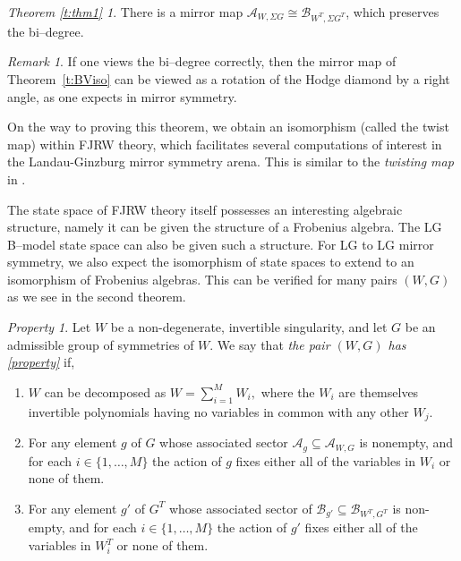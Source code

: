 \documentclass[10pt, letterpaper]{amsart}
\theoremstyle{remark}
\newtheorem{rem}{Remark}[thm]
\providecommand*{\propertyautorefname}{Property}
\newtheorem{property}{\propertyautorefname}
\newtheorem*{thm1}{Theorem \ref{t:thm1}}
\newcommand{\sA}{\mathscr{A}}
\newcommand{\sB}{\mathscr{B}}
\newcommand{\s}[1]{\Sigma #1}
\newcommand{\amanda}[1]{\todo[color=red(munsell),fancyline]{Am:#1}}
\newcommand{\nathan}[1]{\todo[color=pistachio,fancyline]{N:#1}}
\begin{document}
\begin{thm1}
There is a mirror map $\sA_{W,\s{G}}\cong \sB_{W^T,\s{G^T}}$, which preserves the bi--degree. 
\end{thm1}

\begin{rem}
	If one views the bi--degree correctly, then the mirror map of Theorem~\ref{t:BViso} can be viewed as a rotation of the Hodge diamond by a right angle, as one expects in mirror symmetry.
\end{rem}

On the way to proving this theorem, we obtain an isomorphism (called the twist map) within FJRW theory, which facilitates several computations of interest in the Landau-Ginzburg mirror symmetry arena. This is similar to the \textit{twisting map} in \cite{GLY}.  %

The state space of FJRW theory itself possesses an interesting algebraic structure, namely it can be given the structure of a Frobenius algebra. The LG B--model state space can also be given such a structure. For LG to LG mirror symmetry, we also expect the isomorphism of state spaces to extend to an isomorphism of Frobenius algebras. This can be verified for many pairs $(W,G)$ as we see in the second theorem. 

\begin{property}\label{property}
Let $W$ be a non-degenerate, invertible singularity, and let $G$ be an admissible group of symmetries of $W$. We say that \emph{the pair $(W,G)$ has \autoref{property}} if, 
\begin{enumerate}
\item $W$ can be decomposed as
 $   W = \sum_{i=1}^{M} W_i ,$
where the $W_i$ are themselves invertible polynomials having no variables in common with any other $W_j$.  
\item For any element $g$ of $G$ whose associated sector  $\sA_g \subseteq \sA_{W,G}$ is nonempty, and for each $i\in \{1,\dots ,M\}$ the action of $g$ fixes either all of the variables in $W_i$ or none of them. 
\item For any element $g'$ of $G^T$ whose associated sector of $\sB_{g'} \subseteq \sB_{W^T,G^T}$ is non-empty, and for each $i\in \{1,\dots ,M\}$ the action of $g'$ fixes either all of the variables in $W_i^T$ or none of them.
\end{enumerate}
\end{property}
\end{document}
